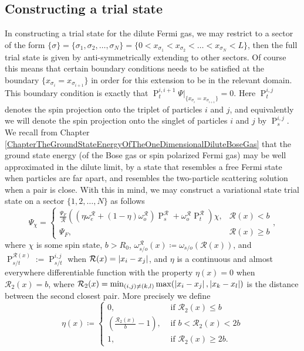 \subsection{Constructing a trial state}
In constructing a trial state for the dilute Fermi gas, we may restrict to a sector of the form $ \{\sigma\}=\{\sigma_1,\sigma_2,\ldots,\sigma_N\}=\{0<x_{\sigma_1}<x_{\sigma_2}<\ldots<x_{\sigma_N}<L\} $, then the full trial state is given by anti-symmetrically extending to other sectors. Of course this means that certain boundary conditions needs to be satisfied at the boundary $ \{x_{\sigma_i}=x_{\sigma_{i+1}}\} $ in order for this extension to be in the relevant domain. This boundary condition is exactly that $ \operatorname{P}_t^{i,i+1} \Psi\rvert_{\{x_{\sigma_i}=x_{\sigma_{i+1}}\}}=0 $. Here $ \operatorname{P}_t^{i,j} $ denotes the spin projection onto the triplet of particles $ i $ and $ j $, and equivalently we will denote the spin projection onto the singlet of particles $ i $ and $ j $ by $ \operatorname{P}_s^{i,j} $. We recall from Chapter \ref{ChapterTheGroundStateEnergyOfTheOneDimensionalDiluteBoseGas} that the ground state energy (of the Bose gas or spin polarized Fermi gas) may be well approximated in the dilute limit, by a state that resembles a free Fermi state when particles are far apart, and resembles the two-particle scattering solution when a pair is close. With this in mind, we may construct a variational state trial state on a sector $ \{1,2,\ldots,N\} $ as follows\begin{equation}\label{EqTrial StateSpin1/2Fermi}
\Psi_\chi=\begin{cases}
\frac{\Psi_F}{\mathcal{R}}\left(\left(\eta\omega^{\mathcal{R}}_e+(1-\eta)\omega^{\mathcal{R}}_o\right)\operatorname{P}_s^{\mathcal{R}}+\omega_o^{\mathcal{R}}\operatorname{P}_t^{\mathcal{R}}\right)\chi,&\mathcal{R}(x)<b\\
\Psi_F,&\mathcal{R}(x)\geq b
\end{cases},
\end{equation}
where $ \chi $ is some spin state, $ b>R_0 $, $ \omega^\mathcal{R}_{s/o}(x)\coloneqq \omega_{s/o}(\mathcal{R}(x)) $, and $ \operatorname{P}_{s/t}^{\mathcal{R}(x)}:=\operatorname{P}_{s/t}^{i,j} $ when $ \mathcal{R}(x)=\left\lvert x_i-x_j \right\rvert $, and $ \eta $ is a continuous and almost everywhere differentiable function with the property $ \eta(x)=0 $ when $ \mathcal{R}_2(x)=b $, where $ \mathcal{R}_2(x)=\min_{(i,j)\neq (k,l)}\max(\left\lvert x_i-x_j \right\rvert,\left\lvert x_k-x_l \right\rvert) $ is the distance between the second closest pair. More precisely we define
\begin{equation}\label{key}
\eta(x)\coloneqq\begin{cases}
0,&\text{ if } \mathcal{R}_2(x)\leq b\\
\left(\frac{\mathcal{R}_2(x)}{b}-1\right), &\text{ if } b<\mathcal{R}_2(x)<2b\\
1, &\text{ if } \mathcal{R}_2(x)\geq 2b.
\end{cases}
\end{equation}
